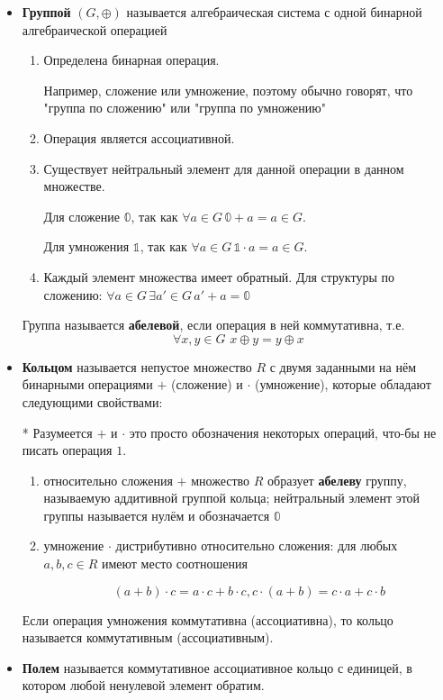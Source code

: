 \begin{itemize}
	\item {\bf Группой} $(G, \oplus)$ называется алгебраическая система с одной бинарной 
	алгебраической операцией
	 
	\begin{enumerate}
		\item Определена бинарная операция. 
		
		Например, сложение или умножение, поэтому обычно говорят, что "группа по сложению" или "группа по умножению"
		
		\item Операция является ассоциативной.
		
		\item Существует нейтральный элемент для данной операции в данном множестве.
		
		Для сложение $\mathbb{0}$, так как $\forall a \in G \, \mathbb{0} + a = a \in G$.
		
		Для умножения $\mathbb{1}$, так как $\forall a \in G \, \mathbb{1} \cdot a = a \in G$.
		
		\item Каждый элемент множества имеет обратный. Для структуры по сложению: $\forall a \in G \, \exists a' \in G \, a' + a = \mathbb{0}$
	
	\end{enumerate}
	
	Группа называется {\bf абелевой}, если операция в ней коммутативна, т.е. $$\forall x, y \in G \, \, x \oplus y = y \oplus x$$

	\item {\bf Кольцом} называется непустое множество $R$ с двумя заданными на нём бинарными операциями $+$ (сложение) и $\cdot$ (умножение), которые обладают следующими свойствами:
	
	* Разумеется $+$ и $\cdot$ это просто обозначения некоторых операций, что-бы не писать операция $1$.
		
	\begin{enumerate}
		
		\item  относительно сложения $+$ множество $R$ образует {\bf абелеву} группу, называемую аддитивной группой кольца; нейтральный элемент этой группы называется нулём и обозначается $\mathbb{0}$
		
		\item умножение $\cdot$ дистрибутивно относительно сложения: для любых $a, b, c \in R$ имеют место соотношения
		
		$$(a + b) \cdot c = a \cdot c + b \cdot c, c \cdot (a + b) = c \cdot a + c \cdot b$$
		
	\end{enumerate}
	
	Если операция умножения коммутативна (ассоциативна), то кольцо называется коммутативным (ассоциативным).
	
	\item {\bf Полем} называется коммутативное ассоциативное кольцо с единицей, в котором любой ненулевой элемент обратим.
	
\end{itemize}

